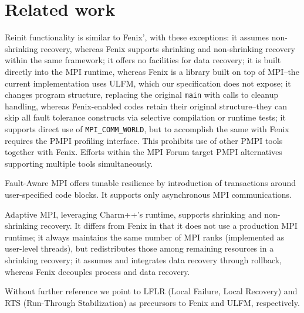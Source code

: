 \section{Related work}\label{sec:related}
Reinit \cite{laguna2016evaluating} functionality is similar to 
Fenix', with these exceptions:
it assumes non-shrinking recovery, whereas Fenix supports shrinking and 
non-shrinking recovery within the same framework;
it offers no facilities for data recovery;
it is built directly into the MPI runtime, whereas Fenix is a library built
on top of MPI--the current implementation uses ULFM, which our specification
does not expose;
it changes program structure, replacing the original \texttt{main} 
with calls to cleanup handling, whereas Fenix-enabled codes retain 
their original structure--they can skip all fault tolerance
constructs via selective compilation or runtime tests;
it supports direct use of \texttt{MPI\_COMM\_WORLD}, but to accomplish
the same with Fenix requires the PMPI profiling interface. This prohibits use 
of other PMPI tools together with Fenix. 
Efforts within the MPI Forum target PMPI alternatives 
supporting multiple tools simultaneously.

Fault-Aware MPI \cite{Hassani15FAMPI} offers tunable  resilience
by introduction of transactions around user-specified code blocks.
It supports only asynchronous MPI communications.

Adaptive MPI, leveraging Charm++'s \cite{charm++} runtime, supports shrinking 
and non-shrinking recovery. 
It differs from Fenix in that it does not use a production
MPI runtime; it always maintains the same number of MPI ranks (implemented
as user-level threads), but redistributes those among remaining resources in
a shrinking recovery; it assumes and integrates data recovery through rollback, 
whereas Fenix decouples process and data recovery.

Without further reference we point to LFLR (Local Failure, Local Recovery) and
RTS (Run-Through Stabilization) as precursors to Fenix and ULFM, respectively.
